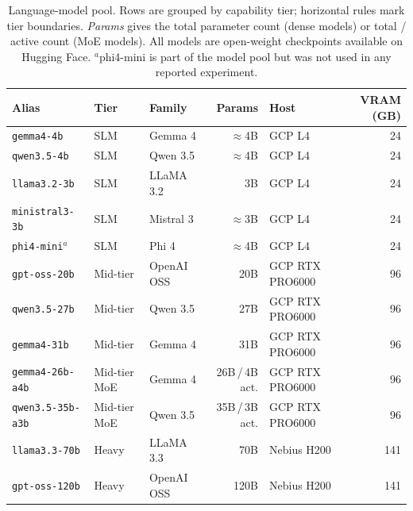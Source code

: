 \begin{table}[htbp]
\centering
\caption{Language-model pool. Rows are grouped by capability tier; horizontal rules mark tier boundaries. \emph{Params} gives the total parameter count (dense models) or total / active count (MoE models). All models are open-weight checkpoints available on Hugging Face. ${}^{a}$phi4-mini is part of the model pool but was not used in any reported experiment.}
\label{tab:model-pool}
\small
\begin{tabular}{@{} l l l r l r @{}}
\toprule
\textbf{Alias} & \textbf{Tier} & \textbf{Family} & \textbf{Params} & \textbf{Host} & \textbf{VRAM (GB)} \\
\midrule
\texttt{gemma4-4b}       & SLM           & Gemma 4       & $\approx$4B        & GCP L4          & 24  \\
\texttt{qwen3.5-4b}      & SLM           & Qwen 3.5      & $\approx$4B        & GCP L4          & 24  \\
\texttt{llama3.2-3b}     & SLM           & LLaMA 3.2     & 3B                 & GCP L4          & 24  \\
\texttt{ministral3-3b}   & SLM           & Mistral 3     & $\approx$3B        & GCP L4          & 24  \\
\texttt{phi4-mini}${}^{a}$ & SLM         & Phi 4         & $\approx$4B        & GCP L4          & 24  \\
\midrule
\texttt{gpt-oss-20b}     & Mid-tier      & OpenAI OSS    & 20B                & GCP RTX PRO6000    & 96  \\
\texttt{qwen3.5-27b}     & Mid-tier      & Qwen 3.5      & 27B                & GCP RTX PRO6000    & 96  \\
\texttt{gemma4-31b}      & Mid-tier      & Gemma 4       & 31B                & GCP RTX PRO6000    & 96  \\
\texttt{gemma4-26b-a4b}  & Mid-tier MoE  & Gemma 4       & 26B\,/\,4B act.    & GCP RTX PRO6000    & 96  \\
\texttt{qwen3.5-35b-a3b} & Mid-tier MoE  & Qwen 3.5      & 35B\,/\,3B act.    & GCP RTX PRO6000    & 96  \\
\midrule
\texttt{llama3.3-70b}    & Heavy         & LLaMA 3.3     & 70B                & Nebius H200     & 141 \\
\texttt{gpt-oss-120b}    & Heavy         & OpenAI OSS    & 120B               & Nebius H200     & 141 \\
\bottomrule
\end{tabular}
\end{table}

